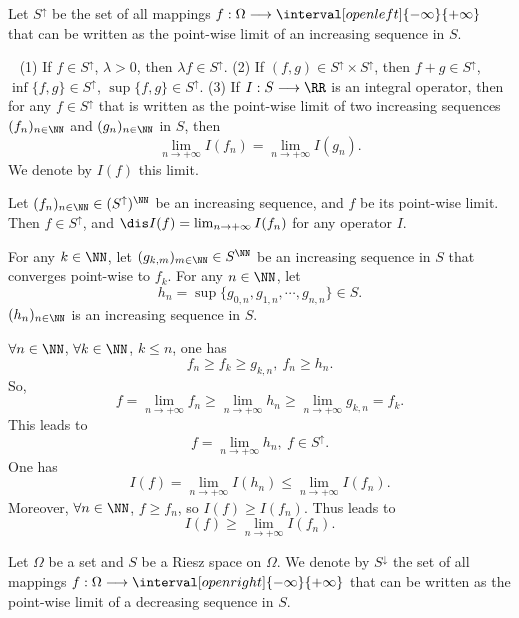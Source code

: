 \begin{definitionenv}
    Let $S^{\uparrow}$ be the set of all mappings $f: \Omega \longrightarrow \interval[open left]{-\infty}{+\infty}$ that can be written as the point-wise limit of an increasing sequence in $S$.
\end{definitionenv}
\begin{remark}
    \ \newline
    (1) If $f\in S^{\uparrow}$, $\lambda>0$, then $\lambda f \in S^{\uparrow}$.
    \newline
    (2) If $(f,g)\in S^{\uparrow}\times S^{\uparrow}$, then $f+g\in S^{\uparrow}$, $\inf\{f,g\}\in S^{\uparrow}$, $\sup\{f,g\}\in S^{\uparrow}$.
    \newline
    (3) If $I:S\longrightarrow \RR$ is an integral operator, then for any $f\in S^{\uparrow}$ that is written as the point-wise limit of two increasing sequences $(f_n)_{n\in\NN}$ and $(g_n)_{n\in\NN}$ in $S$, then 
    $$ \lim_{n\rightarrow +\infty}I(f_n)=\lim_{n\rightarrow +\infty} I(g_n).$$
    We denote by $I(f)$ this limit.
\end{remark}
\begin{propositionenv}
    Let $(f_n)_{n\in\NN}\in (S^{\uparrow})^{\NN}$ be an increasing sequence, and $f$ be its point-wise limit. Then $f\in S^{\uparrow}$, and $\dis I(f)=\lim_{n\rightarrow +\infty}I(f_n)$ for any operator $I$.
\end{propositionenv}
\begin{proofenv}
    For any $k\in \NN$, let $(g_{k,m})_{m\in\NN}\in S^{\NN}$ be an increasing sequence in $S$ that converges point-wise to $f_k$. For any $n\in\NN$, let 
    $$h_n=\sup \{g_{0,n},g_{1,n},\cdots,g_{n,n}\}\in S.$$
    $(h_n)_{n\in\NN}$ is an increasing sequence in $S$. 

    \quad $\forall n\in \NN$, $\forall k\in \NN$, $k\le n$, one has
    $$ f_n\ge f_k \ge g_{k,n},\  f_n\ge h_n.$$
    So,
    $$ f=\lim_{n\rightarrow +\infty} f_n\ge \lim_{n\rightarrow +\infty}h_n \ge \lim_{n\rightarrow +\infty} g_{k,n}=f_k.$$
    This leads to 
    $$ f=\lim_{n\rightarrow +\infty} h_n,\   f\in S^{\uparrow}.$$
    One has
    $$ I(f)=\lim_{n\rightarrow +\infty} I(h_n) \le \lim_{n\rightarrow +\infty} I(f_n).$$
    Moreover, $\forall n\in\NN$, $f\ge f_n$, so $I(f)\ge I(f_n)$. Thus leads to 
    $$I(f)\ge \lim_{n\rightarrow +\infty}I(f_n).$$
\end{proofenv}
\begin{definitionenv}
    Let $\Omega$ be a set and $S$ be a Riesz space on $\Omega$. We denote by $S^{\downarrow}$ the set of all mappings $f: \Omega \longrightarrow \interval[open right]{-\infty}{+\infty}$ that can be written as the point-wise limit of a decreasing sequence in $S$.
\end{definitionenv}
